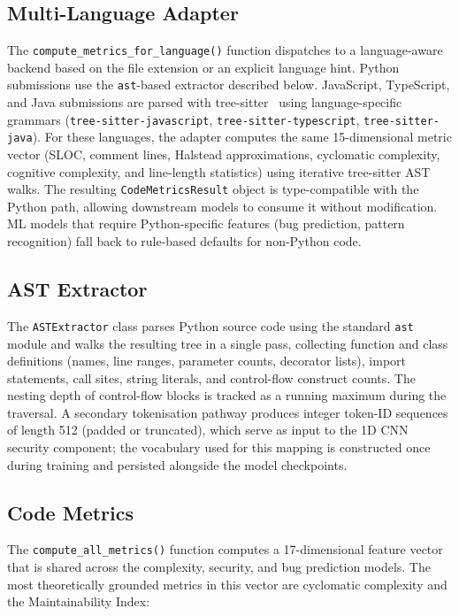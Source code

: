 \documentclass[12pt, oneside]{report}
\begin{document}
\subsection{Multi-Language Adapter}

The \texttt{compute\_metrics\_for\_language()} function dispatches to a language-aware
backend based on the file extension or an explicit language hint. Python submissions
use the \texttt{ast}-based extractor described below. JavaScript, TypeScript, and Java
submissions are parsed with tree-sitter~\cite{tree-sitter} using language-specific
grammars (\texttt{tree-sitter-javascript}, \texttt{tree-sitter-typescript},
\texttt{tree-sitter-java}). For these languages, the adapter computes the same
15-dimensional metric vector (SLOC, comment lines, Halstead approximations, cyclomatic
complexity, cognitive complexity, and line-length statistics) using iterative tree-sitter
AST walks. The resulting \texttt{CodeMetricsResult} object is type-compatible with the
Python path, allowing downstream models to consume it without modification. ML models
that require Python-specific features (bug prediction, pattern recognition) fall back to
rule-based defaults for non-Python code.

\subsection{AST Extractor}

The \texttt{ASTExtractor} class parses Python source code using the standard
\texttt{ast} module and walks the resulting tree in a single pass, collecting function
and class definitions (names, line ranges, parameter counts, decorator lists), import
statements, call sites, string literals, and control-flow construct counts. The nesting
depth of control-flow blocks is tracked as a running maximum during the traversal.
A secondary tokenisation pathway produces integer token-ID sequences of length 512
(padded or truncated), which serve as input to the 1D CNN security component; the
vocabulary used for this mapping is constructed once during training and persisted
alongside the model checkpoints.

\subsection{Code Metrics}

The \texttt{compute\_all\_metrics()} function computes a 17-dimensional feature vector
that is shared across the complexity, security, and bug prediction models. The most
theoretically grounded metrics in this vector are cyclomatic complexity and the
Maintainability Index:
\end{document}
